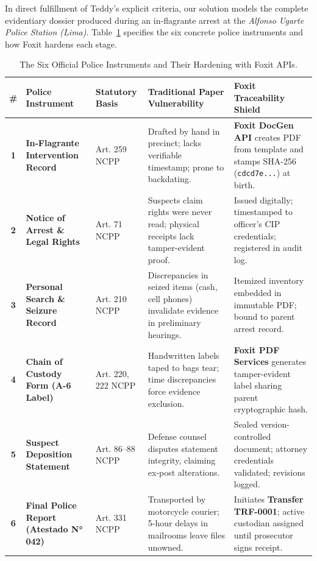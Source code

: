 \documentclass[11pt,a4paper]{article}
\begin{document}
In direct fulfillment of Teddy's explicit criteria, our solution models the complete evidentiary dossier produced during an in-flagrante arrest at the \emph{Alfonso Ugarte Police Station (Lima)}. Table~\ref{tab:dossier} specifies the six concrete police instruments and how Foxit hardens each stage.

\vspace{4pt}

\begin{table}[htbp]
\centering
\small
\begin{tabularx}{\textwidth}{@{}c >{\raggedright\arraybackslash}p{3.4cm} >{\raggedright\arraybackslash}p{2.3cm} >{\raggedright\arraybackslash}X >{\raggedright\arraybackslash}X@{}}
\toprule
\textbf{\#} & \textbf{Police Instrument} & \textbf{Statutory Basis} & \textbf{Traditional Paper Vulnerability} & \textbf{Foxit Traceability Shield} \\
\midrule
\textbf{1} & \textbf{In-Flagrante Intervention Record} & Art. 259 NCPP & Drafted by hand in precinct; lacks verifiable timestamp; prone to backdating. & \textbf{Foxit DocGen API} creates PDF from template and stamps SHA-256 (\texttt{cdcd7e...}) at birth. \\
\addlinespace
\textbf{2} & \textbf{Notice of Arrest \& Legal Rights} & Art. 71 NCPP & Suspects claim rights were never read; physical receipts lack tamper-evident proof. & Issued digitally; timestamped to officer's CIP credentials; registered in audit log. \\
\addlinespace
\textbf{3} & \textbf{Personal Search \& Seizure Record} & Art. 210 NCPP & Discrepancies in seized items (cash, cell phones) invalidate evidence in preliminary hearings. & Itemized inventory embedded in immutable PDF; bound to parent arrest record. \\
\addlinespace
\textbf{4} & \textbf{Chain of Custody Form (A-6 Label)} & Art. 220, 222 NCPP & Handwritten labels taped to bags tear; time discrepancies force evidence exclusion. & \textbf{Foxit PDF Services} generates tamper-evident label sharing parent cryptographic hash. \\
\addlinespace
\textbf{5} & \textbf{Suspect Deposition Statement} & Art. 86--88 NCPP & Defense counsel disputes statement integrity, claiming ex-post alterations. & Sealed version-controlled document; attorney credentials validated; revisions logged. \\
\addlinespace
\textbf{6} & \textbf{Final Police Report (Atestado N° 042)} & Art. 331 NCPP & Transported by motorcycle courier; 5-hour delays in mailrooms leave files unowned. & Initiates \textbf{Transfer TRF-0001}; active custodian assigned until prosecutor signs receipt. \\
\bottomrule
\end{tabularx}
\caption{The Six Official Police Instruments and Their Hardening with Foxit APIs.}
\label{tab:dossier}
\end{table}
\end{document}
